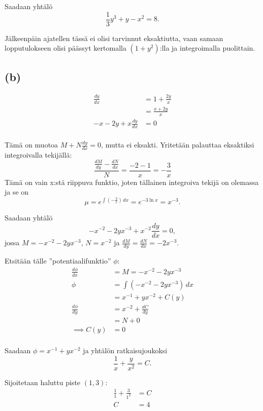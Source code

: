 \documentclass{article}
\begin{document}
Saadaan yhtälö
\[
  \frac{1}{3}y^3 + y - x^2 = 8.
\]

Jälkeenpäin ajatellen tässä ei olisi tarvinnut eksaktiutta, vaan samaan
lopputulokseen olisi päässyt kertomalla $(1 + y^2)$:lla ja integroimalla
puolittain.

\subsection*{(b)}

\begin{align*}
  \frac{dy}{dx} &= 1 + \frac{2y}{x} \\
                &= \frac{x + 2y}{x} \\
  -x - 2y + x\frac{dy}{dx} &= 0 \\
\end{align*}

Tämä on muotoa $M + N\frac{dy}{dx} = 0$, mutta ei eksakti. Yritetään palauttaa
eksaktiksi integroivalla tekijällä:
\[
  \frac{\frac{dM}{dy} - \frac{dN}{dx}}{N} = \frac{-2 - 1}{x} = -\frac{3}{x}
\]
Tämä on vain x:stä riippuva funktio, joten tällainen integroiva tekijä on olemassa
ja se on
\[
  \mu = e^{\int (-\frac{3}{x})\,dx} = e^{-3\ln x} = x^{-3}.
\]

Saadaan yhtälö
\[
  -x^{-2} - 2yx^{-3} + x^{-2}\frac{dy}{dx} = 0,
\]
jossa $M = -x^{-2} - 2yx^{-3}$, $N = x^{-2}$ ja $\frac{dM}{dy} = \frac{dN}{dx} = -2x^{-3}$.

Etsitään tälle ''potentiaalifunktio'' $\phi$:
\begin{align*}
  \frac{d\phi}{dx} &= M = -x^{-2} - 2yx^{-3} \\
  \phi &= \int (-x^{-2} - 2yx^{-3})\,dx \\
       &= x^{-1} + yx^{-2} + C(y) \\
  \frac{d\phi}{dy} &= x^{-2} + \frac{dC}{dy} \\
                   &= N + 0 \\
  \implies C(y) &= 0 \\
\end{align*}

Saadaan $\phi = x^{-1} + yx^{-2}$ ja yhtälön ratkaisujoukoksi
\[
  \frac{1}{x} + \frac{y}{x^2} = C.
\]

Sijoitetaan haluttu piste $(1, 3)$:
\begin{align*}
  \frac{1}{1} + \frac{3}{1^2} &= C \\
  C &= 4 \\
\end{align*}
\end{document}
